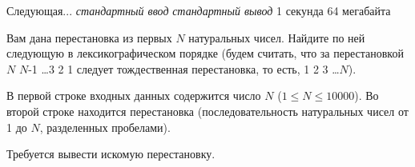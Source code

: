 \begin{problem}%
{Следующая...}%
{\textsl{стандартный ввод}}%
{\textsl{стандартный вывод}}%
{1 секунда}%
{64 мегабайта}{}

Вам дана перестановка из первых $N$ натуральных чисел. Найдите по ней следующую в лексикографическом порядке (будем считать, что за перестановкой $N$ $N$-1 \dots 3 2 1 следует тождественная перестановка, то есть, 1 2 3 \dots $N$).

\InputFile

В первой строке входных данных содержится число $N$ ($1 \le N \le 10000$). Во второй строке находится перестановка (последовательность натуральных чисел от 1 до $N$, разделенных пробелами).

\OutputFile

Требуется вывести искомую перестановку.

\Examples

\begin{example}
%
\end{example}
\end{problem}